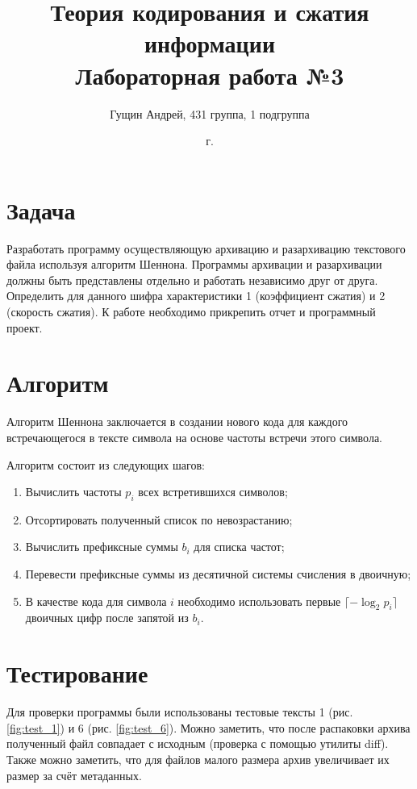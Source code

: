 \documentclass[a4paper,oneside]{article}
\title{{Теория кодирования и сжатия информации}\\{Лабораторная работа №3}}
\author{Гущин Андрей, 431 группа, 1 подгруппа}
\date{\the\year{} г.}
\theoremstyle{definition}
\begin{document}
\maketitle

\section{Задача}

Разработать программу осуществляющую архивацию и разархивацию текстового файла
используя алгоритм Шеннона. Программы архивации и разархивации должны быть
представлены отдельно и работать независимо друг от друга. Определить для
данного шифра характеристики 1 (коэффициент сжатия) и 2 (скорость сжатия). К
работе необходимо прикрепить отчет и программный проект.


\section{Алгоритм}

Алгоритм Шеннона заключается в создании нового кода для каждого встречающегося
в тексте символа на основе частоты встречи этого символа.

Алгоритм состоит из следующих шагов:
\begin{enumerate}
  \item Вычислить частоты $p_i$ всех встретившихся символов;
  \item Отсортировать полученный список по невозрастанию;
  \item Вычислить префиксные суммы $b_i$ для списка частот;
  \item Перевести префиксные суммы из десятичной системы счисления в двоичную;
  \item
    В качестве кода для символа $i$ необходимо использовать первые
    $\lceil -\log_2 p_i \rceil$ двоичных цифр после запятой из $b_i$.
\end{enumerate}


\section{Тестирование}

Для проверки программы были использованы тестовые тексты 1 (рис.
\ref{fig:test_1}) и 6 (рис. \ref{fig:test_6}). Можно заметить,
что после распаковки архива полученный файл совпадает с исходным (проверка
с помощью утилиты diff). Также можно заметить, что для файлов малого размера
архив увеличивает их размер за счёт метаданных.
\end{document}
